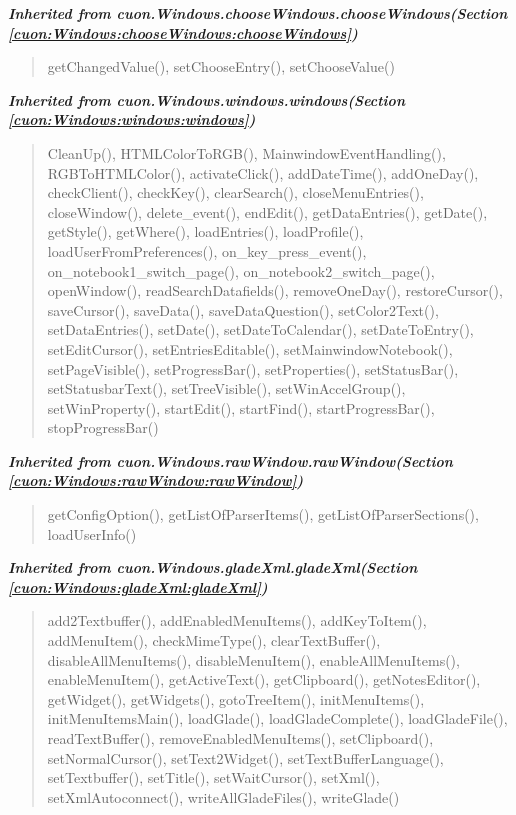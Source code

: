\large{\textbf{\textit{Inherited from cuon.Windows.chooseWindows.chooseWindows\textit{(Section \ref{cuon:Windows:chooseWindows:chooseWindows})}}}}

\begin{quote}
getChangedValue(), setChooseEntry(), setChooseValue()
\end{quote}

\large{\textbf{\textit{Inherited from cuon.Windows.windows.windows\textit{(Section \ref{cuon:Windows:windows:windows})}}}}

\begin{quote}
CleanUp(), HTMLColorToRGB(), MainwindowEventHandling(), RGBToHTMLColor(), activateClick(), addDateTime(), addOneDay(), checkClient(), checkKey(), clearSearch(), closeMenuEntries(), closeWindow(), delete\_event(), endEdit(), getDataEntries(), getDate(), getStyle(), getWhere(), loadEntries(), loadProfile(), loadUserFromPreferences(), on\_key\_press\_event(), on\_notebook1\_switch\_page(), on\_notebook2\_switch\_page(), openWindow(), readSearchDatafields(), removeOneDay(), restoreCursor(), saveCursor(), saveData(), saveDataQuestion(), setColor2Text(), setDataEntries(), setDate(), setDateToCalendar(), setDateToEntry(), setEditCursor(), setEntriesEditable(), setMainwindowNotebook(), setPageVisible(), setProgressBar(), setProperties(), setStatusBar(), setStatusbarText(), setTreeVisible(), setWinAccelGroup(), setWinProperty(), startEdit(), startFind(), startProgressBar(), stopProgressBar()
\end{quote}

\large{\textbf{\textit{Inherited from cuon.Windows.rawWindow.rawWindow\textit{(Section \ref{cuon:Windows:rawWindow:rawWindow})}}}}

\begin{quote}
getConfigOption(), getListOfParserItems(), getListOfParserSections(), loadUserInfo()
\end{quote}

\large{\textbf{\textit{Inherited from cuon.Windows.gladeXml.gladeXml\textit{(Section \ref{cuon:Windows:gladeXml:gladeXml})}}}}

\begin{quote}
add2Textbuffer(), addEnabledMenuItems(), addKeyToItem(), addMenuItem(), checkMimeType(), clearTextBuffer(), disableAllMenuItems(), disableMenuItem(), enableAllMenuItems(), enableMenuItem(), getActiveText(), getClipboard(), getNotesEditor(), getWidget(), getWidgets(), gotoTreeItem(), initMenuItems(), initMenuItemsMain(), loadGlade(), loadGladeComplete(), loadGladeFile(), readTextBuffer(), removeEnabledMenuItems(), setClipboard(), setNormalCursor(), setText2Widget(), setTextBufferLanguage(), setTextbuffer(), setTitle(), setWaitCursor(), setXml(), setXmlAutoconnect(), writeAllGladeFiles(), writeGlade()
\end{quote}

